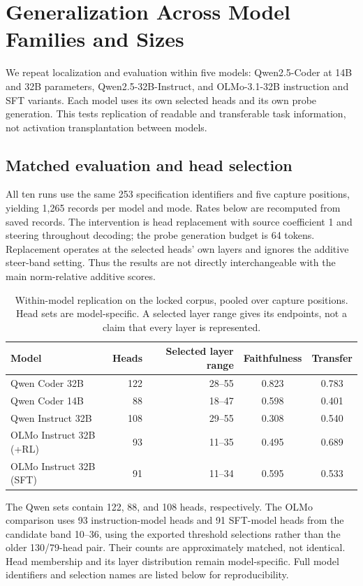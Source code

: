 \section{Generalization Across Model Families and Sizes}
\label{app:olmo}
\label{app:model_comparison}
\label{sec:steer:crossmodel}
We repeat localization and evaluation within five models: Qwen2.5-Coder at 14B and 32B parameters, Qwen2.5-32B-Instruct, and OLMo-3.1-32B instruction and SFT variants. Each model uses its own selected heads and its own probe generation. This tests replication of readable and transferable task information, not activation transplantation between models.

\subsection{Matched evaluation and head selection}
All ten runs use the same 253 specification identifiers and five capture positions, yielding 1,265 records per model and mode. Rates below are recomputed from saved records. The intervention is head replacement with source coefficient 1 and steering throughout decoding; the probe generation budget is 64 tokens. Replacement operates at the selected heads' own layers and ignores the additive steer-band setting. Thus the results are not directly interchangeable with the main norm-relative additive scores.

\begin{table}[ht]\centering\small
\begin{tabular}{lrrcc}\toprule
Model & Heads & Selected layer range & Faithfulness & Transfer\\\midrule
Qwen Coder 32B & 122 & 28--55 & 0.823 & 0.783 \\
Qwen Coder 14B & 88 & 18--47 & 0.598 & 0.401 \\
Qwen Instruct 32B & 108 & 29--55 & 0.308 & 0.540 \\
OLMo Instruct 32B (+RL) & 93 & 11--35 & 0.495 & 0.689 \\
OLMo Instruct 32B (SFT) & 91 & 11--34 & 0.595 & 0.533 \\
\bottomrule\end{tabular}
\caption{Within-model replication on the locked corpus, pooled over capture positions. Head sets are model-specific. A selected layer range gives its endpoints, not a claim that every layer is represented.}
\label{tab:model-comparison}
\end{table}

The Qwen sets contain 122, 88, and 108 heads, respectively. The OLMo comparison uses 93 instruction-model heads and 91 SFT-model heads from the candidate band 10--36, using the exported threshold selections rather than the older 130/79-head pair. Their counts are approximately matched, not identical. Head membership and its layer distribution remain model-specific. Full model identifiers and selection names are listed below for reproducibility.

